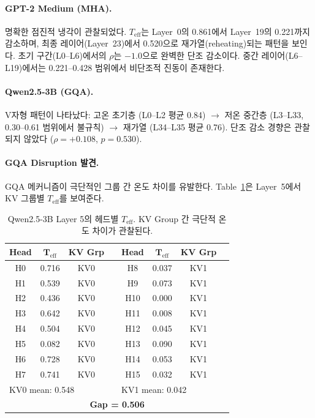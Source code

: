 \documentclass[11pt,a4paper]{article}
\begin{document}
\paragraph{GPT-2 Medium (MHA).}
명확한 점진적 냉각이 관찰되었다.
$T_\mathrm{eff}$는 Layer~0의 0.861에서 Layer~19의 0.221까지 감소하며, 최종 레이어(Layer~23)에서 0.520으로 재가열(reheating)되는 패턴을 보인다.
초기 구간(L0--L6)에서의 $\rho$는 $-1.0$으로 완벽한 단조 감소이다.
중간 레이어(L6--L19)에서는 0.221--0.428 범위에서 비단조적 진동이 존재한다.

\paragraph{Qwen2.5-3B (GQA).}
V자형 패턴이 나타났다: 고온 초기층 (L0--L2 평균 0.84) $\to$ 저온 중간층 (L3--L33, 0.30--0.61 범위에서 불규칙) $\to$ 재가열 (L34--L35 평균 0.76).
단조 감소 경향은 관찰되지 않았다 ($\rho = +0.108$, $p = 0.530$).

\paragraph{GQA Disruption 발견.}
GQA 메커니즘이 극단적인 그룹 간 온도 차이를 유발한다.
Table~\ref{tab:gqa_disruption}은 Layer~5에서 KV 그룹별 $T_\mathrm{eff}$를 보여준다.

\begin{table}[H]
\centering
\caption{Qwen2.5-3B Layer 5의 헤드별 $T_\mathrm{eff}$. KV Group 간 극단적 온도 차이가 관찰된다.}
\label{tab:gqa_disruption}
\begin{tabular}{cccc|cccc}
\toprule
\textbf{Head} & $\boldsymbol{T_\mathrm{eff}}$ & \textbf{KV Grp} & &
\textbf{Head} & $\boldsymbol{T_\mathrm{eff}}$ & \textbf{KV Grp} & \\
\midrule
H0 & 0.716 & KV0 & & H8  & 0.037 & KV1 & \\
H1 & 0.539 & KV0 & & H9  & 0.073 & KV1 & \\
H2 & 0.436 & KV0 & & H10 & 0.000 & KV1 & \\
H3 & 0.642 & KV0 & & H11 & 0.008 & KV1 & \\
H4 & 0.504 & KV0 & & H12 & 0.045 & KV1 & \\
H5 & 0.082 & KV0 & & H13 & 0.090 & KV1 & \\
H6 & 0.728 & KV0 & & H14 & 0.053 & KV1 & \\
H7 & 0.741 & KV0 & & H15 & 0.032 & KV1 & \\
\midrule
\multicolumn{3}{l}{KV0 mean: 0.548} & & \multicolumn{3}{l}{KV1 mean: 0.042} & \\
\multicolumn{8}{c}{\textbf{Gap = 0.506}} \\
\bottomrule
\end{tabular}
\end{table}
\end{document}
